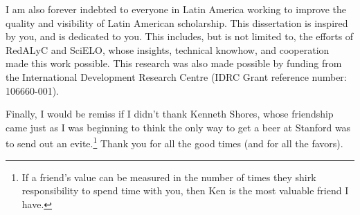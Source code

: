 I am also forever indebted to everyone in Latin America working to improve the quality and visibility of Latin American scholarship. This dissertation is inspired by you, and is dedicated to you. This includes, but is not limited to, the efforts of RedALyC and SciELO, whose insights, technical knowhow, and cooperation made this work possible. This research was also made possible by funding from the International Development Research Centre (IDRC Grant reference number: 106660-001).

Finally, I would be remiss if I didn't thank Kenneth Shores, whose friendship came just as I was beginning to think the only way to get a beer at Stanford was to send out an evite.\footnote{If a friend's value can be measured in the number of times they shirk responsibility to spend time with you, then Ken is the most valuable friend I have.} Thank you for all the good times (and for all the favors).







